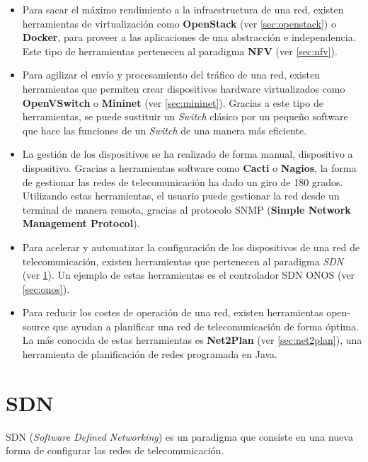 \begin{itemize}
	\item Para sacar el máximo rendimiento a la infraestructura de una red, existen herramientas de virtualización como \textbf{OpenStack} (ver \ref{sec:openstack}) o \textbf{Docker}, para proveer a las aplicaciones de una abstracción e independencia. Este tipo de herramientas pertenecen al paradigma \textbf{NFV} (ver \ref{sec:nfv}).
	
	\item Para agilizar el envío y procesamiento del tráfico de una red, existen herramientas que permiten crear dispositivos hardware virtualizados como \textbf{OpenVSwitch} o \textbf{Mininet} (ver \ref{sec:mininet}). Gracias a este tipo de herramientas, se puede sustituir un \textit{Switch} clásico por un pequeño software que hace las funciones de un \textit{Switch} de una manera más eficiente.
	
	\item La gestión de los dispositivos se ha realizado de forma manual, dispositivo a dispositivo. Gracias a herramientas software como \textbf{Cacti} o \textbf{Nagios}, la forma de gestionar las redes de telecomunicación ha dado un giro de 180 grados. Utilizando estas herramientas, el usuario puede gestionar la red desde un terminal de manera remota, gracias al protocolo SNMP (\textbf{Simple Network Management Protocol}).
	
	\item Para acelerar y automatizar la configuración de los dispositivos de una red de telecomunicación, existen herramientas que pertenecen al paradigma \textit{SDN} (ver \ref{sec:sdn}). Un ejemplo de estas herramientas es el controlador SDN ONOS (ver \ref{sec:onos}).
	
	\item Para reducir los costes de operación de una red, existen herramientas open-source que ayudan a planificar una red de telecomunicación de forma óptima. La más conocida de estas herramientas es \textbf{Net2Plan} (ver \ref{sec:net2plan}), una herramienta de planificación de redes programada en Java.
\end{itemize}

\section{SDN}
\label{sec:sdn}

SDN (\textit{Software Defined Networking}) es un paradigma que consiste en una nueva forma de configurar las redes de telecomunicación. 

